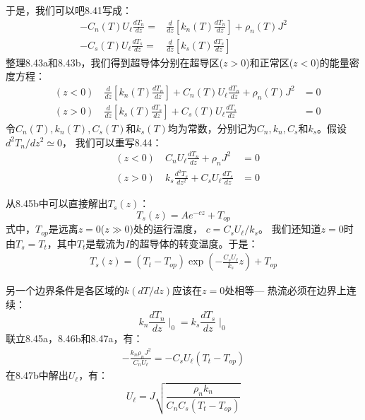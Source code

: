 于是，我们可以吧8.41写成：
\begin{subequations}
	\begin{align}
-C_n(T)U_\ell\frac{dT_n}{dz}=&\frac{d}{dz}\left[k_n(T)\frac{dT_n}{dz}\right]+\rho_n(T)J^2\\
-C_s(T)U_\ell\frac{dT_s}{dz}=&\frac{d}{dz}\left[k_s(T)\frac{dT_s}{dz}\right]
	\end{align}
\end{subequations}
整理8.43a和8.43b，我们得到超导体分别在超导区($z>0$)和正常区($z<0$)的能量密度方程：
\begin{subequations}
	\begin{align}
&(z<0)\quad      \frac{d}{dz}\left[k_n(T)\frac{dT_n}{dz}\right]+C_n(T)U_\ell\frac{dT_n}{dz}+\rho_n(T)J^2&=0\\
&(z>0)\quad      \frac{d}{dz}\left[k_s(T)\frac{dT_s}{dz}\right]+C_s(T)U_\ell\frac{dT_s}{dz}&=0
	\end{align}
\end{subequations}
令$C_n(T),k_n(T), C_s(T)$和$k_s(T)$均为常数，分别记为$C_n,k_n, C_s$和$k_s$。假设$d^2 T_n/dz^2\simeq 0$，
我们可以重写8.44：
\begin{subequations}
	\begin{align}
	&(z<0)\quad     C_nU_\ell\frac{dT_n}{dz}+\rho_nJ^2&=0\\
&	(z>0)\quad     k_s\frac{d^2T_s}{dz^2}+C_sU_\ell\frac{dT_s}{dz}&=0
	\end{align}
\end{subequations}

从8.45b中可以直接解出$T_s(z)$：
\begin{equation}%
T_s(z)=Ae^{-cz}+T_{op}
\end{equation}
式中，$T_{op}$是远离$z=0$($z\gg 0$)处的运行温度，
$c=C_s U_\ell/k_s$。
我们还知道$z=0$时由$T_s=T_t$，其中$T_t$是载流为$I$的超导体的转变温度。于是：
\begin{align*}%
T_s(z)=(T_t-T_{op})\exp\left(-\frac{C_sU_\ell}{k_s}z\right)+T_{op} \tag{8.46b}
\end{align*}

另一个边界条件是各区域的$k(dT/dz)$应该在$z=0$处相等---
热流必须在边界上连续：
\begin{equation}%
k_n\frac{dT_n}{dz}\mid_0=k_s\frac{dT_s}{dz}\mid_0
\end{equation}
联立8.45a，8.46b和8.47a，有：
\begin{align*}%
-\frac{k_n\rho_nJ^2}{C_nU_\ell}=-C_sU_\ell(T_t-T_{op}) \tag{8.47b}
\end{align*}
在8.47b中解出$U_\ell$，有：
\begin{equation}%
U_\ell=J\sqrt{\frac{\rho_nk_n}{C_nC_s(T_t-T_{op})}}
\end{equation}

